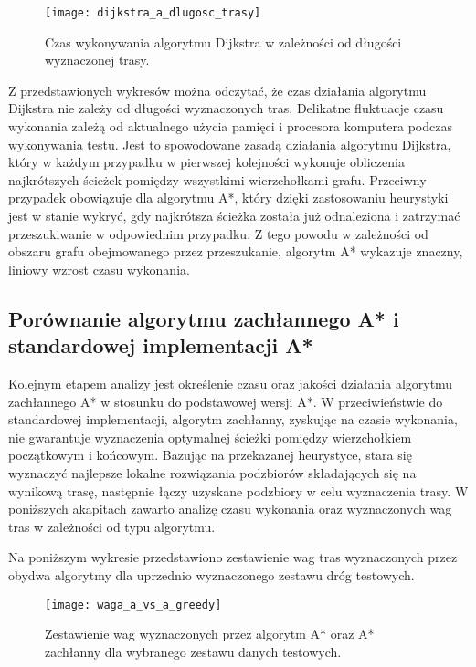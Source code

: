 \begin{figure}[H]
\centering
\texttt{[image: dijkstra\_a\_dlugosc\_trasy]}
\caption{Czas wykonywania algorytmu Dijkstra w zależności od długości wyznaczonej trasy.}
\end{figure}

Z przedstawionych wykresów można odczytać, że czas działania algorytmu Dijkstra nie zależy od długości wyznaczonych tras. Delikatne fluktuacje czasu wykonania zależą od aktualnego użycia pamięci i procesora komputera podczas wykonywania testu. Jest to spowodowane zasadą działania algorytmu Dijkstra, który w każdym przypadku w pierwszej kolejności wykonuje obliczenia najkrótszych ścieżek pomiędzy wszystkimi wierzchołkami grafu.
Przeciwny przypadek obowiązuje dla algorytmu A*, który dzięki zastosowaniu heurystyki jest w stanie wykryć, gdy najkrótsza ścieżka została już odnaleziona i zatrzymać przeszukiwanie w odpowiednim przypadku. Z tego powodu w zależności od obszaru grafu obejmowanego przez przeszukanie, algorytm A* wykazuje znaczny, liniowy wzrost czasu wykonania.

\subsection{Porównanie algorytmu zachłannego A* i standardowej implementacji A*}

Kolejnym etapem analizy jest określenie czasu oraz jakości działania algorytmu zachłannego A* w stosunku do podstawowej wersji A*. W przeciwieństwie do standardowej implementacji, algorytm zachłanny, zyskując na czasie wykonania, nie gwarantuje wyznaczenia optymalnej ścieżki pomiędzy wierzchołkiem początkowym i końcowym. Bazując na przekazanej heurystyce, stara się wyznaczyć najlepsze lokalne rozwiązania podzbiorów składających się na wynikową trasę, następnie łączy uzyskane podzbiory w celu wyznaczenia trasy. W poniższych akapitach zawarto analizę czasu wykonania oraz wyznaczonych wag tras w zależności od typu algorytmu.

Na poniższym wykresie przedstawiono zestawienie wag tras wyznaczonych przez obydwa algorytmy dla uprzednio wyznaczonego zestawu dróg testowych.

\begin{figure}[H]
\centering
\texttt{[image: waga\_a\_vs\_a\_greedy]}
\caption{Zestawienie wag wyznaczonych przez algorytm A* oraz A* zachłanny dla wybranego zestawu danych testowych.}
\end{figure}


